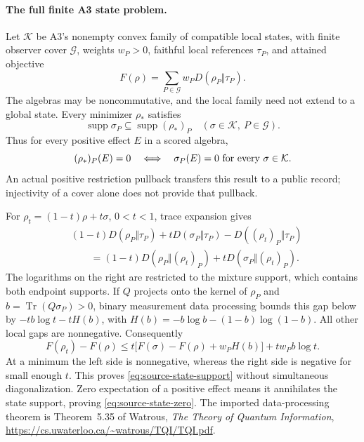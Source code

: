 \paragraph{The full finite A3 state problem.}
Let $\mathcal K$ be A3's nonempty convex family of compatible local states,
with finite observer cover $\mathcal G$, weights $w_P>0$, faithful local
references $\tau_P$, and attained objective
\[
 F(\rho)=\sum_{P\in\mathcal G}w_P D(\rho_P\Vert\tau_P).
\]
The algebras may be noncommutative, and the local family need not extend
to a global state. Every minimizer $\rho_*$ satisfies
\begin{equation}
 \operatorname{supp}\sigma_P\subseteq\operatorname{supp}(\rho_*)_P
 \quad(\sigma\in\mathcal K,\ P\in\mathcal G).
 \label{eq:source-state-support}
\end{equation}
Thus for every positive effect $E$ in a scored algebra,
\begin{equation}
 (\rho_*)_P(E)=0
 \quad\Longleftrightarrow\quad
 \sigma_P(E)=0\ \hbox{for every }\sigma\in\mathcal K.
 \label{eq:source-state-zero}
\end{equation}
An actual positive restriction pullback transfers this result to a public
record; injectivity of a cover alone does not provide that pullback.

For $\rho_t=(1-t)\rho+t\sigma$, $0<t<1$, trace expansion gives
\begin{align*}
 &(1-t)D(\rho_P\Vert\tau_P)+tD(\sigma_P\Vert\tau_P)
          -D((\rho_t)_P\Vert\tau_P)\\
 &\qquad=(1-t)D(\rho_P\Vert(\rho_t)_P)
              +tD(\sigma_P\Vert(\rho_t)_P).
\end{align*}
The logarithms on the right are restricted to the mixture support,
which contains both endpoint supports. If $Q$ projects onto the kernel of
$\rho_P$ and $b=\operatorname{Tr}(Q\sigma_P)>0$, binary measurement data
processing bounds this gap below by $-tb\log t-tH(b)$, with
$H(b)=-b\log b-(1-b)\log(1-b)$. All other local gaps are nonnegative.
Consequently
\[
 F(\rho_t)-F(\rho)
 \leq t\bigl[F(\sigma)-F(\rho)+w_PH(b)\bigr]+tw_Pb\log t.
\]
At a minimum the left side is nonnegative, whereas the right side is
negative for small enough $t$. This proves \eqref{eq:source-state-support}
without simultaneous diagonalization. Zero expectation of a positive
effect means it annihilates the state support, proving
\eqref{eq:source-state-zero}. The imported data-processing theorem is
Theorem~5.35 of Watrous, \emph{The Theory of Quantum Information},
\url{https://cs.uwaterloo.ca/~watrous/TQI/TQI.pdf}.

